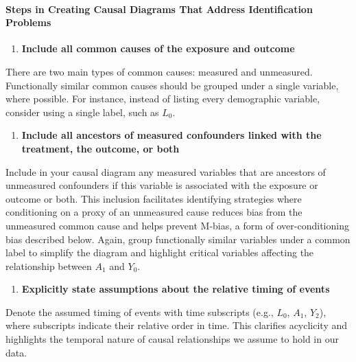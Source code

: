 \documentclass[
  singlecolumn]{article}
\let\oldparagraph\paragraph
\renewcommand{\paragraph}[1]{\oldparagraph{#1}\mbox{}}
\providecommand{\tightlist}{%
  \setlength{\itemsep}{0pt}\setlength{\parskip}{0pt}}\usepackage{longtable,booktabs,array}
\begin{document}
\paragraph{Steps in Creating Causal Diagrams That Address Identification
Problems}\label{steps-in-creating-causal-diagrams-that-address-identification-problems}

\begin{enumerate}
\def\labelenumi{\arabic{enumi}.}
\tightlist
\item
  \textbf{Include all common causes of the exposure and outcome}
\end{enumerate}

There are two main types of common causes: measured and unmeasured.
Functionally similar common causes should be grouped under a single
variable, where possible. For instance, instead of listing every
demographic variable, consider using a single label, such as \(L_0\).

\begin{enumerate}
\def\labelenumi{\arabic{enumi}.}
\setcounter{enumi}{1}
\tightlist
\item
  \textbf{Include all ancestors of measured confounders linked with the
  treatment, the outcome, or both}
\end{enumerate}

Include in your causal diagram any measured variables that are ancestors
of unmeasured confounders if this variable is associated with the
exposure or outcome or both. This inclusion facilitates identifying
strategies where conditioning on a proxy of an unmeasured cause reduces
bias from the unmeasured common cause and helps prevent M-bias, a form
of over-conditioning bias described below. Again, group functionally
similar variables under a common label to simplify the diagram and
highlight critical variables affecting the relationship between \(A_1\)
and \(Y_0\).

\begin{enumerate}
\def\labelenumi{\arabic{enumi}.}
\setcounter{enumi}{2}
\tightlist
\item
  \textbf{Explicitly state assumptions about the relative timing of
  events}
\end{enumerate}

Denote the assumed timing of events with time subscripts (e.g., \(L_0\),
\(A_1\), \(Y_2\)), where subscripts indicate their relative order in
time. This clarifies acyclicity and highlights the temporal nature of
causal relationships we assume to hold in our data.
\end{document}
